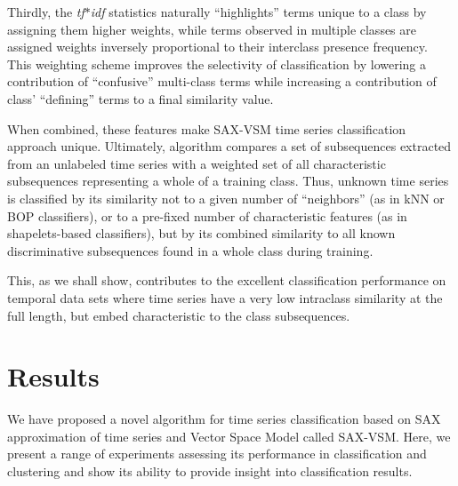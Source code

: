 Thirdly, the \textit{tf$\ast$idf} statistics naturally ``highlights'' terms unique to a
class by assigning them higher weights, while terms observed in multiple classes are 
assigned weights inversely proportional to their interclass presence frequency. 
This weighting scheme improves the selectivity of classification by  lowering a 
contribution of ``confusive'' multi-class terms while increasing a contribution 
of  class' ``defining'' terms to a final similarity value.   

When combined, these features make SAX-VSM time series classification approach 
unique. 
Ultimately, algorithm compares a set of subsequences extracted from an unlabeled time series 
with a weighted set of all characteristic subsequences representing a whole of a training class. 
Thus, unknown time series is classified by its similarity not to a given number of ``neighbors'' 
(as in kNN or BOP classifiers), or to a pre-fixed number of characteristic features (as in
shapelets-based classifiers), but by its combined similarity to all known discriminative
subsequences found in a whole class during training.

This, as we shall show, contributes to the excellent classification performance on temporal 
data sets where time series have a very low intraclass similarity at the full length, but 
embed characteristic to the class subsequences. 

\section{Results} \label{results}
We have proposed a novel algorithm for time series classification based on SAX
approximation of time series and Vector Space Model called SAX-VSM. Here, we present 
a range of experiments assessing its performance in classification and clustering and show
its ability to provide insight into classification results.

